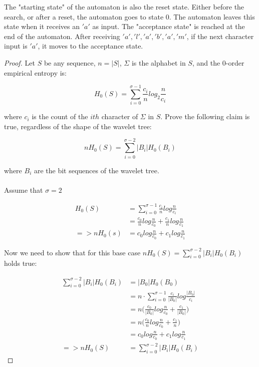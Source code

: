 \documentclass[11pt]{article}
\begin{document}
The "starting state" of the automaton is also the reset state. Either before the search, or after a reset, the automaton goes to state 0. The automaton leaves this state when it receives an $'a'$ as input. The "acceptance state" is reached at the end of the automaton. After receiving ${ 'a', 'l', 'a', 'b', 'a', 'm' }$, if the next character input is $'a'$, it moves to the acceptance state.


\bigskip
{}

\begin{proof}
Let $S$ be any sequence, $n = |S|$, $\Sigma$ is the alphabet in $S$, and the 0-order empirical entropy is:

$$
H_0(S) = \sum_{i=0}^{\sigma-1}\frac{c_i}{n}log_2\frac{n}{c_i}
$$

where $c_i$ is the count of the $ith$ character of $\Sigma$ in $S$. Prove the following claim is true, regardless of the shape of the wavelet tree:

$$
nH_0(S) = \sum_{i=0}^{\sigma-2}|B_i|H_0(B_i)
$$

where $B_i$ are the bit sequences of the wavelet tree. \\
\\

Assume that $\sigma = 2$

\begin{align*}
H_0(S) &= \sum_{i=0}^{\sigma-1} \frac{c_i}{n} log \frac{n}{c_i} \\
           &= \frac{c_0}{n} log \frac{n}{c_0} + \frac{c_1}{n} log \frac{n}{c_1} \\
=> nH_0(s) &= c_0 log \frac{n}{c_0} + c_1 log \frac{n}{c_1}
\end{align*}

Now we need to show that for this base case $nH_0(S) = \sum_{i=0}^{\sigma-2}|B_i|H_0(B_i)$ holds true:

\begin{align*}
\sum_{i=0}^{\sigma-2} |B_i|H_0(B_i) &= |B_0|H_0(B_0) \\
                                    &= n \cdot \sum_{i=0}^{\sigma-1} \frac{c_i}{|B_0|} log \frac{|B_0|}{c_i} \\
                                    &= n \Big( \frac{c_0}{|B_0|} log \frac{n}{c_0} + \frac{c_1}{|B_0|} \Big) \\
                                    &= n \Big( \frac{c_0}{n} log \frac{n}{c_0} + \frac{c_1}{n} \Big) \\
                                    &= c_0 log \frac{n}{c_0} + c_1 log \frac{n}{c_1} \\
=> nH_0(S) &= \sum_{i=0}^{\sigma-2} |B_i|H_0(B_i)
\end{align*}


\end{proof}
\end{document}
